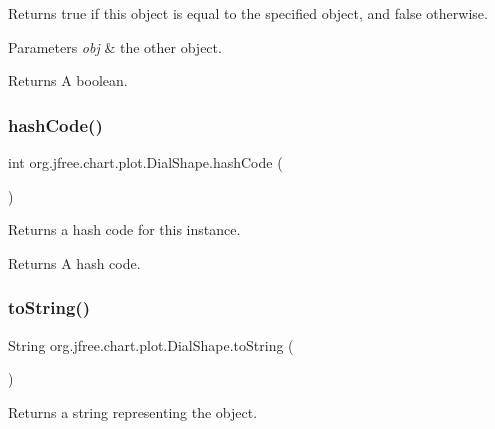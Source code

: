 Returns {\ttfamily true} if this object is equal to the specified object, and {\ttfamily false} otherwise.


\begin{DoxyParams}{Parameters}
{\em obj} & the other object.\\
\hline
\end{DoxyParams}
\begin{DoxyReturn}{Returns}
A boolean. 
\end{DoxyReturn}
\mbox{\label{classorg_1_1jfree_1_1chart_1_1plot_1_1_dial_shape_ad75f917a86f7316d7bf690ece704bc3b}} 
\subsubsection{\texorpdfstring{hash\+Code()}{hashCode()}}
{\footnotesize\ttfamily int org.\+jfree.\+chart.\+plot.\+Dial\+Shape.\+hash\+Code (\begin{DoxyParamCaption}{ }\end{DoxyParamCaption})}

Returns a hash code for this instance.

\begin{DoxyReturn}{Returns}
A hash code. 
\end{DoxyReturn}
\mbox{\label{classorg_1_1jfree_1_1chart_1_1plot_1_1_dial_shape_ae97e57f7edc16c4bf8ca48147f97d4c2}} 
\subsubsection{\texorpdfstring{to\+String()}{toString()}}
{\footnotesize\ttfamily String org.\+jfree.\+chart.\+plot.\+Dial\+Shape.\+to\+String (\begin{DoxyParamCaption}{ }\end{DoxyParamCaption})}

Returns a string representing the object.

